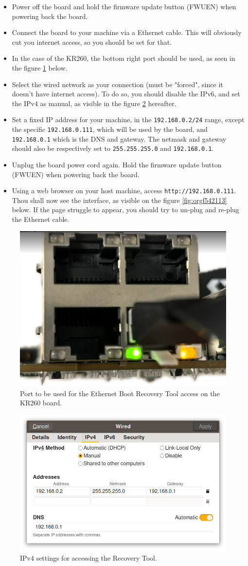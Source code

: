 \documentclass[10pt]{article}
\begin{document}
\begin{itemize}
\item Power off the board and hold the firmware update button (FWUEN) when powering back the board.
\item Connect the board to your machine via a Ethernet cable.
This will obviously cut you internet access, so you should be set for that.
\item In the case of the KR260, the bottom right port should be used, as seen in the
figure \ref{fig:org23e1e82} below.
\item Select the wired network as your connection (must be "forced", since it
doesn't have internet access). To do so, you should disable the IPv6, and set
the IPv4 as manual, as visible in the figure \ref{fig:org1aa5381} hereafter.
\item Set a fixed IP address for your machine, in the \texttt{192.168.0.2/24}
range, except the specific \texttt{192.168.0.111}, which will be used by the
board, and \texttt{192.168.0.1} which is the DNS and gateway.
The netmask and gateway should also be respectively set to
\texttt{255.255.255.0} and \texttt{192.168.0.1}.
\item Unplug the board power cord again. Hold the firmware update button (FWUEN)
when powering back the board.
\item Using a web browser on your host machine, access \texttt{http://192.168.0.111}. Thou
shall now see the interface, as visible on the figure \ref{fig:orgf542113} below. If
the page struggle to appear, you should try to un-plug and re-plug the
Ethernet cable.
\end{itemize}

\begin{figure}[htbp]
\centering
\includegraphics[width=.4\textwidth]{img/krport.png}
\caption{\label{fig:org23e1e82}Port to be used for the Ethernet Boot Recovery Tool access on the KR260 board.}
\end{figure}

\begin{figure}[htbp]
\centering
\includegraphics[width=.6\textwidth]{img/ipv4set.png}
\caption{\label{fig:org1aa5381}IPv4 settings for accessing the Recovery Tool.}
\end{figure}
\end{document}
